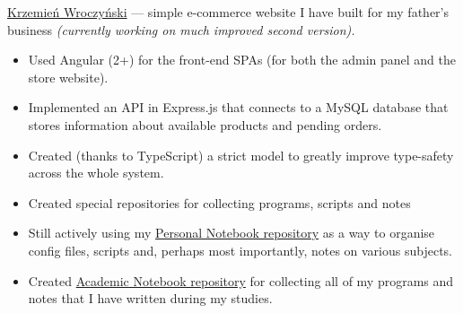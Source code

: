 \documentclass[10pt,a4paper,ragged2e,withhyper]{altacv}
\begin{document}
\begin{paracol}{2}



\divider


\divider


\divider






\small\href{https://wroczynski.pl}{Krzemień Wroczyński} — simple e-commerce website I have built for my father’s business \textit{(currently working on much improved second version).}
\smallskip

\begin{itemize}
\item Used Angular (2+) for the front-end SPAs (for both the admin panel and the store website).
\item Implemented an API in Express.js that connects to a MySQL database that stores information about available products and pending orders.
\item Created (thanks to TypeScript) a strict model to greatly improve type-safety across the whole system.
\end{itemize}

\divider

\begin{itemize}
\item Created special repositories for collecting programs, scripts and notes
\item Still actively using my \href{https://github.com/jerry-sky/personal-notebook#readme}{Personal Notebook repository} as a way to organise config files, scripts and, perhaps most importantly, notes on various subjects.
\item Created \href{https://github.com/jerry-sky/academic-notebook#readme}{Academic Notebook repository} for collecting all of my programs and notes that I have written during my studies.
\end{itemize}


\end{paracol}
\end{document}
